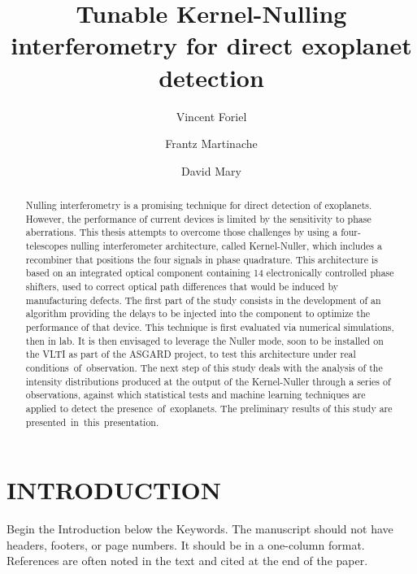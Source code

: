 \documentclass[]{spie}  %
\title{Tunable Kernel-Nulling interferometry for direct exoplanet detection}
\author[a,*]{Vincent Foriel}
\author[a]{Frantz Martinache}
\author[a]{David Mary}
\affil[a]{Université Côte d’Azur, Observatoire de la Côte d’Azur Nice, CNRS, Laboratoire Lagrange, Nice, France}
\begin{document}
 
\maketitle

\begin{abstract}
    Nulling interferometry is a promising technique for direct detection of exoplanets. However, the performance of current devices is limited by the sensitivity to phase aberrations. This thesis attempts to overcome those challenges by using a four-telescopes nulling interferometer architecture, called Kernel-Nuller\cite{Martinache et al. 2018}, which includes a recombiner that positions the four signals in phase quadrature. This architecture is based on an integrated optical component containing 14 electronically controlled phase shifters, used to correct optical path differences that would be induced by manufacturing defects. The first part of the study consists in the development of an algorithm providing   the delays to be injected into the component to optimize the performance of that device. This   technique is first evaluated via numerical simulations, then in lab. It is then envisaged to leverage the Nuller mode, soon to be installed on the VLTI as part of the ASGARD project, to test this architecture under real conditions of observation. The next step of this study deals with the analysis of the intensity distributions produced at the output of the Kernel-Nuller\cite{Martinache et al. 2018, Cvetojevic et al. 2022} through a series of observations, against which statistical tests and machine learning techniques are applied to detect the presence of exoplanets. The preliminary results of this study are presented in this presentation.
\end{abstract}


\section{INTRODUCTION}
\label{sec:intro}  %

Begin the Introduction below the Keywords. The manuscript should not have headers, footers, or page numbers. It should be in a one-column format. References are often noted in the text and cited at the end of the paper.
\end{document}
